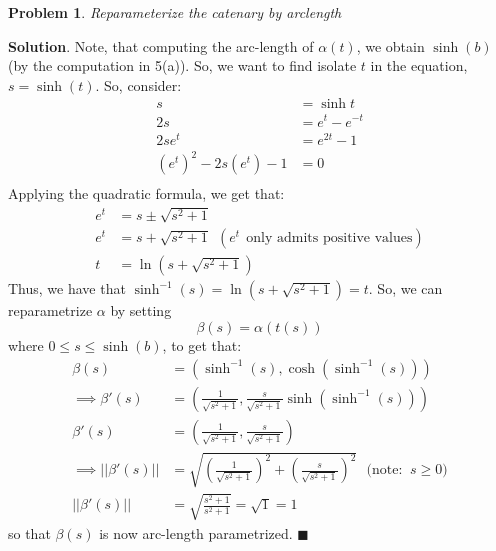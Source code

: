 \documentclass[12pt]{article}
\newcommand{\abs}[1]{\left| #1 \right|} %
\renewcommand{\=}[1]{\stackrel{#1}{=}} %
\newtheorem{p}{Problem}[section]
\theoremstyle{definition}
\newenvironment{s}{%
        \begin{trivlist} \item \textbf{Solution}. }{%
            \hspace*{\fill} $\blacksquare$\end{trivlist}}%
\begin{document}
\begin{p}
    Reparameterize the catenary by arclength
\end{p}
\begin{s}
    Note, that computing the arc-length of $\alpha(t)$, we obtain $\sinh(b)$ (by the computation in 5(a)).
    So, we want to find isolate $t$ in the equation, $s = \sinh(t)$.
    So, consider:
    \begin{align*}
        s &= \sinh t \\
        2s &= e^t - e^{-t} \\
        2se^t &= e^{2t} - 1 \\
        (e^t)^2 - 2s(e^t) - 1 &= 0 \\
    \end{align*}
    Applying the quadratic formula, we get that:
    \begin{align*}
        e^t &= s \pm \sqrt{s^2 + 1} \\
        e^t &= s + \sqrt{s^2+1}\:\: (e^t\:\: \text{only admits positive values}) \\
        t &= \ln(s + \sqrt{s^2+1})
    \end{align*}
    Thus, we have that $\sinh^{-1}(s) = \ln(s+\sqrt{s^2+1}) = t$. So, we can reparametrize $\alpha$ by
    setting
    \[ \beta(s) = \alpha(t(s)) \]
    where $0 \leq s \leq \sinh(b)$, to get that:
    \begin{align*}
        \beta(s) &= (\sinh^{-1}(s), \cosh(\sinh^{-1}(s))) \\
        \implies \beta'(s) &= (\frac{1}{\sqrt{s^2+1}}, \frac{s}{\sqrt{s^2+1}}\sinh(\sinh^{-1}(s))) \\
        \beta'(s) &= (\frac{1}{\sqrt{s^2+1}}, \frac{s}{\sqrt{s^2+1}}) \\
        \implies \abs{\abs{\beta'(s)}} &= \sqrt{ (\frac{1}{\sqrt{s^2+1}})^2 + (\frac{s}{\sqrt{s^2+1}})^2 }\:\:\:\text{(note: }\: s\geq 0)\\
        \abs{\abs{\beta'(s)}} &= \sqrt{\frac{s^2+1}{s^2+1}} = \sqrt{1} = 1
    \end{align*}
    so that $\beta(s)$ is now arc-length parametrized.
\end{s}
\end{document}
